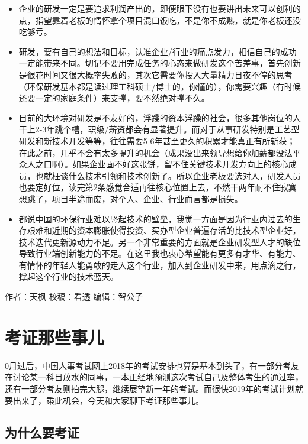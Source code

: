 \documentclass[]{book}
\begin{document}
\begin{itemize}
\item
  企业的研发一定是要追求利润产出的，即便眼下没有也要讲出未来可以创利的点，指望靠着老板的情怀拿个项目混口饭吃，不是你不成熟，就是你老板还没吃够亏。
\item
  研发，要有自己的想法和目标，认准企业/行业的痛点发力，相信自己的成功一定能带来不同。切记不要用完成任务的心态来做研发这个苦差事，首先创新是很花时间又很大概率失败的，其次它需要你投入大量精力日夜不停的思考（环保研发基本都是读过理工科硕士/博士的，你懂的），你需要兴趣（有时候还要一定的家庭条件）来支撑，要不然绝对撑不久。
\item
  目前的大环境对研发是不友好的，浮躁的资本浮躁的社会，很多其他岗位的人干上2-3年跳个槽，职级/薪资都会有显著提升。而对于从事研发特别是工艺型研发和新技术开发等等，往往需要5-6年甚至更久的积累才能真正有所斩获；在此之前，几乎不会有太多提升的机会（成果没出来领导想给你加薪都没法平众人之口啊）。如果企业画不好这张饼，留不住关键技术开发方向上的核心成员，也就枉谈什么技术引领和技术创新了。所以企业老板要选对人，研发人员也要定好位，读完第2条感觉合适再往核心位置上去，不然干两年耐不住寂寞想跳了，项目半途而废，对个人、企业、行业而言都是损失。
\item
  都说中国的环保行业难以竖起技术的壁垒，我觉一方面是因为行业内过去的生存艰难和近期的资本膨胀使得投资、买办型企业普遍存活的比技术型企业好，技术迭代更新源动力不足。另一个非常重要的方面就是企业研发型人才的缺位导致行业端创新能力的不足。在这里我也衷心希望能有更多有才华、有能力、有情怀的年轻人能勇敢的走入这个行业，加入到企业研发中来，用点滴之行，撑起这个行业的技术蓝天。
\end{itemize}

作者：天枫
校稿：看透
编辑：智公子

\hypertarget{ux8003ux8bc1ux90a3ux4e9bux4e8bux513f}{%
\section{考证那些事儿}\label{ux8003ux8bc1ux90a3ux4e9bux4e8bux513f}}

0月过后，中国人事考试网上2018年的考试安排也算是基本到头了，有一部分考友在讨论某一科目放水的同事，一本正经地预测这次考试自己及整体考生的通过率，还有一部分考友则拍完大腿，继续展望新一年的考试。而很快2019年的考试计划就要出来了，乘此机会，今天和大家聊下考证那些事儿。

\hypertarget{ux4e3aux4ec0ux4e48ux8981ux8003ux8bc1}{%
\subsection{为什么要考证}\label{ux4e3aux4ec0ux4e48ux8981ux8003ux8bc1}}
\end{document}
